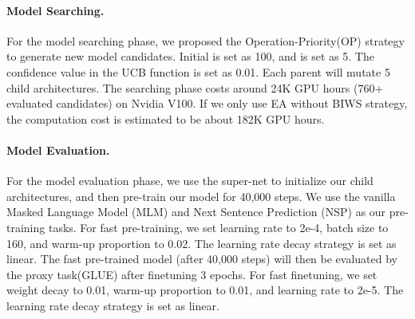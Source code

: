\documentclass[letterpaper]{article} \usepackage{aaai22}  \usepackage{times}  \usepackage{helvet}  \usepackage{courier}  \usepackage[hyphens]{url}  \usepackage{graphicx} \urlstyle{rm} \def\UrlFont{\rm}  \usepackage{natbib}  \usepackage{caption} \DeclareCaptionStyle{ruled}{labelfont=normalfont,labelsep=colon,strut=off} \frenchspacing  \setlength{\pdfpagewidth}{8.5in}  \setlength{\pdfpageheight}{11in}  \usepackage{algorithm}
\begin{document}
\paragraph{Model Searching.}
For the model searching phase, we proposed the Operation-Priority(OP) strategy to generate new model candidates. Initial {} is set as 100, and  is set as 5. The confidence value  in the UCB function is set as 0.01. Each parent will mutate 5 child architectures. The searching phase costs around 24K GPU hours (760+ evaluated candidates) on Nvidia V100. If we only use EA without BIWS strategy, the computation cost is estimated to be about 182K GPU hours. 

\paragraph{Model Evaluation.}
For the model evaluation phase, we use the super-net to initialize our child architectures, and then pre-train our model for 40,000 steps. We use the vanilla Masked Language Model (MLM) and Next Sentence Prediction (NSP) as our pre-training tasks. For fast pre-training, we set learning rate to 2e-4, batch size to 160, and warm-up proportion to 0.02. The learning rate decay strategy is set as linear. The fast pre-trained model (after 40,000 steps) will then be evaluated by the proxy task(GLUE) after finetuning 3 epochs. For fast finetuning, we set weight decay to 0.01, warm-up proportion to 0.01, and learning rate to 2e-5. The learning rate decay strategy is set as linear.
\end{document}
